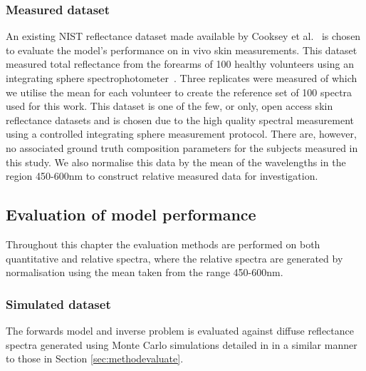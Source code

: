 \subsubsection{Measured dataset}
An existing NIST reflectance dataset made available by Cooksey et al.~\cite{Cooksey2017} is chosen to evaluate the model's performance on in vivo skin measurements. This dataset measured total reflectance from the forearms of 100 healthy volunteers using an integrating sphere spectrophotometer~\cite{Cooksey2017}. Three replicates were measured of which we utilise the mean for each volunteer to create the reference set of 100 spectra used for this work. This dataset is one of the few, or only, open access skin reflectance datasets and is chosen due to the high quality spectral measurement using a controlled integrating sphere measurement protocol. There are, however, no associated ground truth composition parameters for the subjects measured in this study. We also normalise this data by the mean of the wavelengths in the region 450-600nm to construct relative measured data for investigation. 
\FloatBarrier

\subsection{Evaluation of model performance}\label{sec:methodevaluate2}
Throughout this chapter the evaluation methods are performed on both quantitative and relative spectra, where the relative spectra are generated by normalisation using the mean taken from the range 450-600nm.
\subsubsection{Simulated dataset}
The forwards model and inverse problem is evaluated against diffuse reflectance spectra generated using Monte Carlo simulations detailed in  in a similar manner to those in Section \ref{sec:methodevaluate}. 
%

